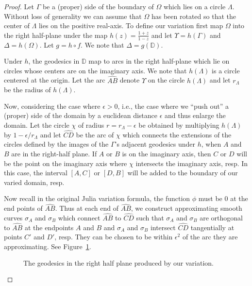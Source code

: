 \documentclass{lms}
\newcommand{\D}{\mathbb D}
\newcommand{\e}{\epsilon}
\numberwithin{equation}{section}
\begin{document}
\begin{proof}

Let $\Gamma$ be a (proper) 
side of the boundary of $\Omega$ which lies on a circle $\Lambda$.  
Without loss of generality we can assume that $\Omega$ 
has been rotated so that the center
of $\Lambda$ lies on the positive real-axis. To define our variation first map
$\Omega$ into the right half-plane under the map $h(z) = \frac{1+z}{1-z}$ and 
let $\Upsilon = h(\Gamma)$ and $\Delta  = h(\Omega)$. Let $g = h \circ
 f$.  We note that
$\Delta = g(\D)$.

Under $h$, the geodesics in 
$\D$ map to arcs in the right half-plane which lie on circles whose centers are 
on the imaginary axis. We note that $h(\Lambda)$ is a circle centered at the origin. 
Let the arc $\widehat{AB}$ denote $\Upsilon $ on the circle $h(\Lambda)$ and let 
$r_{\Lambda}$ be the radius of $h(\Lambda)$.  

Now, considering the case where $\e > 0$, i.e., the
case where we ``push out'' a (proper) side of the domain by a euclidean
distance $\e$ and thus  enlarge the domain.  Let the 
circle $\chi$ of radius $r = r_{\Lambda} - \e$ be obtained by
multiplying
 $h(\Lambda)$ by 
$1- \e/r_\Lambda$
 and let $\widehat{CD}$ be the arc of $\chi$ which connects the extensions 
of the circles defined by the images of the $\Gamma$'s adjacent geodesics under $h$, 
when $A$ and $B$ are in the right-half plane. If $A$ or $B$ is on the imaginary axis, 
then $C$ or $D$ will be the point on the imaginary axis where $\chi$ intersects the 
imaginary axis, resp.  In this case, the interval $[A,C]$ or $[D,B]$ will be added to 
the boundary of our varied domain, resp.

Now recall in the original Julia variation formula, the function
 $\phi$
 must be $0$ at 
the end points of $\widehat{AB}$.  Thus at each end of $\widehat{AB}$,
we construct approximating
smooth curves $\sigma_A$ and $\sigma_B$ which connect $\widehat{AB}$ to 
$\widehat{CD}$ such that $\sigma_A$ and $\sigma_B$ are orthogonal to $\widehat{AB}$ 
at the endpoints $A$ and $B$ and $\sigma_A$ and $\sigma_B$ intersect 
$\widehat{CD}$ tangentially at points $C'$ and $D'$, resp.  They can be chosen to be 
within $\e^2$ of the arc they are approximating.  See Figure~\ref{F:julia-half-plane}.


\begin{figure}
\begin{center}
\caption{The geodesics in the right half plane produced by our variation.}
\label{F:julia-half-plane}
\end{center}
\end{figure}



\end{proof}
\end{document}

